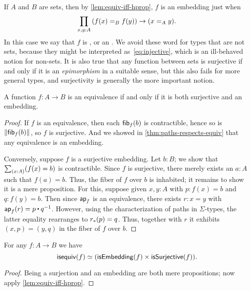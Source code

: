 If $A$ and $B$ are sets, then by \autoref{lem:equiv-iff-hprop}, $f$ is an embedding just when
\begin{equation}
  \prd{x,y:A} (\id[B]{f(x)}{f(y)}) \to (\id[A]xy).\label{eq:injective}
\end{equation}
In this case we say that $f$ is ,
%
%
or an .
%
We avoid these word for types that are not sets, because they might be interpreted as~\eqref{eq:injective}, which is an ill-behaved notion for non-sets.
It is also true that any function between sets is surjective if and only if it is an \emph{epimorphism} in a suitable sense, but this also fails for more general types, and surjectivity is generally the more important notion.

\begin{thm}\label{thm:mono-surj-equiv}
  A function $f:A\to B$ is an equivalence if and only if it is both surjective and an embedding.
\end{thm}
\begin{proof}
  If $f$ is an equivalence, then each ${\mathsf{fib}}_{f}(b)$ is contractible, hence so is $\mathopen{}\left\Vert {\mathsf{fib}}_{f}(b)\right\Vert_{}\mathclose{}$, so $f$ is surjective.
  And we showed in \autoref{thm:paths-respects-equiv} that any equivalence is an embedding.

  Conversely, suppose $f$ is a surjective embedding.
  Let $b:B$; we show that $\sm{x:A}(f(x)=b)$ is contractible.
  Since $f$ is surjective, there merely exists an $a:A$ such that $f(a)=b$.
  Thus, the fiber of $f$ over $b$ is inhabited; it remains to show it is a mere proposition.
  For this, suppose given $x,y:A$ with $p:f(x)=b$ and $q:f(y)=b$.
  Then since $\mathsf{ap}_{f}$ is an equivalence, there exists $r:x=y$ with $\apfunc f (r) = p \ct \opp q$.
  However, using the characterization of paths in $\Sigma$-types, the latter equality rearranges to ${r}_{*}\mathopen{}\left({p}\right)\mathclose{} = q$.
  Thus, together with $r$ it exhibits $(x,p) = (y,q)$ in the fiber of $f$ over $b$.
\end{proof}

\begin{cor}
  For any $f:A\to B$ we have
  \[ \mathsf{isequiv}(f) \simeq (\mathsf{isEmbedding}(f) \times \mathsf{isSurjective}(f)).\]
\end{cor}
\begin{proof}
  Being a surjection and an embedding are both mere propositions; now apply \autoref{lem:equiv-iff-hprop}.
\end{proof}

